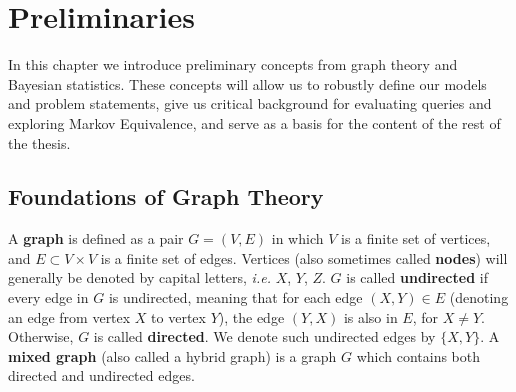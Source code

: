 \chapter{Preliminaries}

\null \quad \quad In this chapter we introduce preliminary concepts from graph theory and Bayesian statistics. These concepts will allow us to robustly define our models and problem statements, give us critical background for evaluating queries and exploring Markov Equivalence, and serve as a basis for the content of the rest of the thesis.

\section{Foundations of Graph Theory}

\begin{definition}
A \textbf{graph} is defined as a pair $G = (V,E)$ in which $V$ is a finite set of vertices, and $E \subset V \times V$ is a finite set of edges. Vertices (also sometimes called \textbf{nodes}) will generally be denoted by capital letters, \textit{i.e.} $X$, $Y$, $Z$. $G$ is called \textbf{undirected} if every edge in $G$ is undirected, meaning that for each edge $(X,Y) \in E$ (denoting an edge from vertex $X$ to vertex $Y$), the edge $(Y,X)$ is also in $E$, for $X \neq Y$. Otherwise, $G$ is called \textbf{directed}. We denote such undirected edges by $\{X,Y\}$. A \textbf{mixed graph} (also called a hybrid graph) is a graph $G$ which contains both directed and undirected edges.
\end{definition}

\begin{figure}[h!]
\begin{center}
\end{center}
\caption{}
\end{figure}

